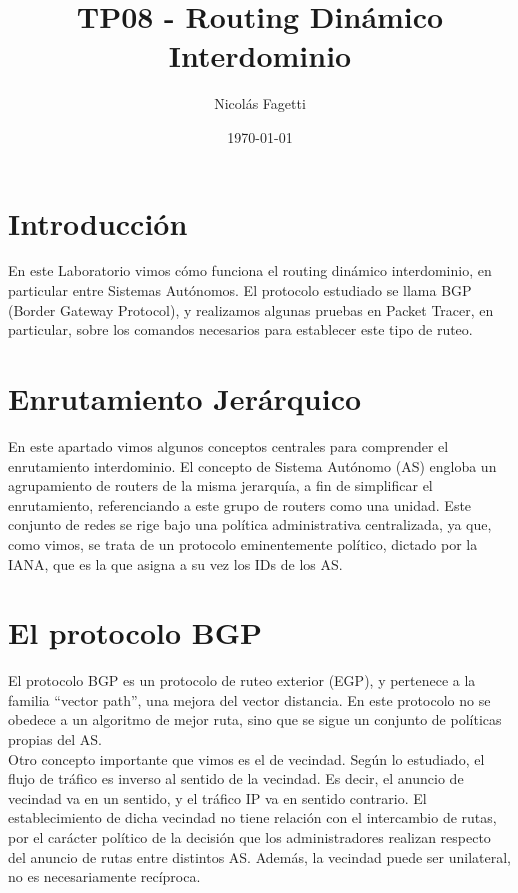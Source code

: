 \documentclass{article}
\title{TP08 - Routing Din\'amico Interdominio}
\author{Nicolás Fagetti}
\date{\today}
\begin{document}
\maketitle

\section{Introducci\'on}
En este Laboratorio vimos c\'omo funciona el routing din\'amico interdominio, en particular entre Sistemas Aut\'onomos. El protocolo estudiado se llama BGP (Border Gateway Protocol), y realizamos algunas pruebas en Packet Tracer, en particular, sobre los comandos necesarios para establecer este tipo de ruteo.

\section{Enrutamiento Jer\'arquico}

En este apartado vimos algunos conceptos centrales para comprender el enrutamiento interdominio. El concepto de Sistema Aut\'onomo (AS) engloba un agrupamiento de routers de la misma jerarqu\'ia, a fin de simplificar el enrutamiento, referenciando a este grupo de routers como una unidad. Este conjunto de redes se rige bajo una pol\'itica administrativa centralizada, ya que, como vimos, se trata de un protocolo eminentemente pol\'itico, dictado por la IANA, que es la que asigna a su vez los IDs de los AS. \\

\section{El protocolo BGP}
El protocolo BGP es un protocolo de ruteo exterior (EGP), y pertenece a la familia ``vector path'', una mejora del vector distancia.
En este protocolo no se obedece a un algoritmo de mejor ruta, sino que se sigue un conjunto de pol\'iticas propias del AS. \\

Otro concepto importante que vimos es el de vecindad. Seg\'un lo estudiado, el flujo de tr\'afico es inverso al sentido de la vecindad. Es decir, el anuncio de vecindad va en un sentido, y el tr\'afico IP va en sentido contrario. El establecimiento de dicha vecindad no tiene relaci\'on con el intercambio de rutas, por el car\'acter pol\'itico de la decisi\'on que los administradores realizan respecto del anuncio de rutas entre distintos AS. Adem\'as, la vecindad puede ser unilateral, no es necesariamente rec\'iproca. \\
\end{document}
